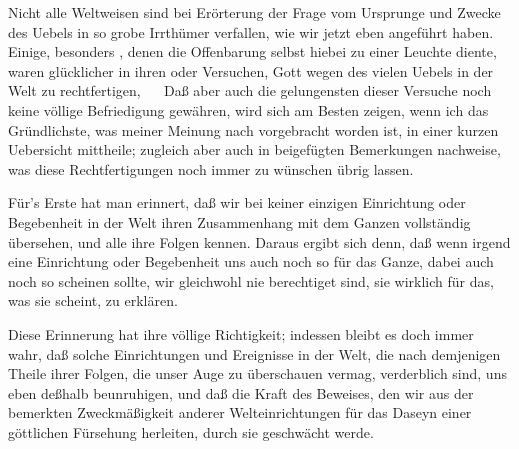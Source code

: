 Nicht alle Weltweisen sind bei Erörterung der Frage vom Ursprunge und Zwecke des Uebels in so grobe Irrthümer verfallen, wie wir jetzt eben angeführt haben. Einige, besonders , denen die Offenbarung selbst hiebei zu einer Leuchte diente, waren glücklicher in ihren  oder Versuchen, Gott wegen des vielen Uebels in der Welt zu rechtfertigen, \zB\  \uA\ Daß aber auch die gelungensten dieser Versuche noch keine völlige Befriedigung gewähren, wird sich am Besten zeigen, wenn ich das Gründlichste, was meiner Meinung nach vorgebracht worden ist, in einer kurzen Uebersicht mittheile; zugleich aber auch in beigefügten Bemerkungen nachweise, was diese Rechtfertigungen noch immer zu wünschen übrig lassen.
\begin{aufza}
\item Für's Erste hat man erinnert, daß wir bei keiner einzigen Einrichtung oder Begebenheit in der Welt ihren Zusammenhang mit dem Ganzen vollständig übersehen, und alle ihre Folgen kennen. Daraus ergibt sich denn, daß wenn irgend eine Einrichtung oder Begebenheit uns auch noch so  für das Ganze, dabei auch noch so  scheinen sollte, wir gleichwohl nie berechtiget sind, sie wirklich für das, was sie scheint, zu erklären.\par
\end{aufza}
Diese Erinnerung hat ihre völlige Richtigkeit; indessen bleibt es doch immer wahr, daß solche Einrichtungen und Ereignisse in der Welt, die nach demjenigen Theile ihrer Folgen, die unser Auge zu überschauen vermag, verderblich sind, uns eben deßhalb beunruhigen, und daß die Kraft des Beweises, den wir aus der bemerkten Zweckmäßigkeit anderer Welteinrichtungen für das Daseyn einer göttlichen Fürsehung herleiten, durch sie geschwächt werde.
